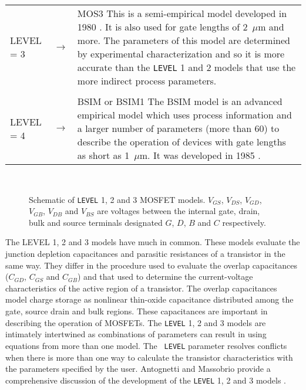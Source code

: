 \noindent\begin{tabular}{p{0.9in}p{0.2in}p{4in}}
         LEVEL = 3& $\rightarrow$ &  MOS3\newline
             This is a semi-empirical model developed in 1980
             \cite{vladimirescu:liu:80}.  It is also
         used for gate lengths of 2~$\mu$m and more.
         The parameters of this model are determined by experimental
         characterization and so it is more accurate than the {\tt LEVEL}
             1 and 2 models that use the more indirect process parameters.
\notforsspice{
         \\
         \\
         LEVEL = 4& $\rightarrow$ &  BSIM or BSIM1\newline
             The BSIM model is an advanced empirical model which uses process
         information and a larger number of parameters (more than 60)
         to describe the operation of devices with gate lengths as short
         as 1~$\mu$m.  It was developed in 1985 \cite{sheu:scharfetter:87}.
         }
         \end{tabular}\\[0.1in]
  \noindent\myline
\begin{figure}[h]
\epsfxsize=2.75in\centerline{}
\caption[Schematic of {\tt LEVEL} 1, 2 and 3 MOSFET
models]{Schematic of {\tt LEVEL} 1, 2 and 3 MOSFET models.
\label{mlevel123} $V_{GS}$, $V_{DS}$, $V_{GD}$, $V_{GB}$, $V_{DB}$
and $V_{BS}$ are voltages between the internal gate, drain, bulk
and source terminals designated $G$, $D$, $B$ and $C$
respectively. }
\end{figure}

\noindent The {LEVEL} 1, 2 and 3 models have much in common. These
models evaluate the junction depletion capacitances and parasitic
resistances of a transistor in the same way. They differ in the
procedure used to evaluate the overlap capacitances ($C_{GD}$,
$C_{GS}$ and $C_{GB}$) and that used to determine the
current-voltage characteristics of the active region of a
transistor. The overlap capacitances model charge storage as
nonlinear thin-oxide capacitance distributed among the gate,
source drain and bulk regions. These capacitances are important in
describing the operation of MOSFETs. The {\tt LEVEL} 1, 2 and 3
models are intimately intertwined as combinations of parameters
can result in using equations from more than one model. The {\tt
LEVEL} parameter resolves conflicts when there is more than one
way to calculate the transistor characteristics with the
parameters specified by the user. Antognetti and Massobrio provide
a comprehensive discussion of the development of the {\tt LEVEL}
1, 2 and 3 models \cite{antognetti:massobrio:88}.


